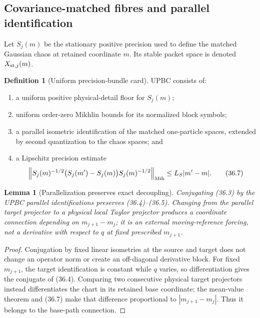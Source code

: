 \documentclass[11pt,oneside]{book}
\newtheorem{lemma}[theorem]{Lemma}
\theoremstyle{definition}
\newtheorem{definition}[theorem]{Definition}
\theoremstyle{remark}
\begin{document}
\subsection{Covariance-matched fibres and parallel identification}

Let \(S_j(m)\) be the stationary positive precision used to define
the matched Gaussian chaos at retained coordinate \(m\).  Its stable
packet space is denoted \(X_{{\rm st},j}(m)\).

\begin{definition}[Uniform precision-bundle card]
\label{def:e8v36-precision-card}
UPBC consists of:
\begin{enumerate}
\item a uniform positive physical-detail floor for \(S_j(m)\);
\item uniform order-zero Mikhlin bounds for its normalized block
      symbols;
\item a parallel isometric identification of the matched
      one-particle spaces, extended by second quantization to the
      chaos spaces; and
\item a Lipschitz precision estimate
\[
 \left\|
 S_j(m)^{-1/2}\bigl(S_j(m')-S_j(m)\bigr)S_j(m)^{-1/2}
 \right\|_{\rm Mih}
 \leq L_S|m'-m|.                                    \tag{36.7}
\]
\end{enumerate}
\end{definition}

\begin{lemma}[Parallelization preserves exact decoupling]
\label{lem:e8v36-parallel-decoupling}
Conjugating (36.3) by the UPBC parallel identifications preserves
(36.4)--(36.5).  Changing from the parallel target projector to a
physical local Taylor projector produces a coordinate connection
depending on \(m_{j+1}-m_j\); it is an external moving-reference
forcing, not a derivative with respect to \(q\) at fixed prescribed
\(m_{j+1}\).
\end{lemma}

\begin{proof}
Conjugation by fixed linear isometries at the source and target
does not change an operator norm or create an off-diagonal derivative
block.  For fixed \(m_{j+1}\), the target identification is constant
while \(q\) varies, so differentiation gives the conjugate of
(36.4).  Comparing two consecutive physical target projectors
instead differentiates the chart in its retained base coordinate;
the mean-value theorem and (36.7) make that difference proportional
to \(|m_{j+1}-m_j|\).  Thus it belongs to the base-path connection.
\end{proof}
\end{document}
